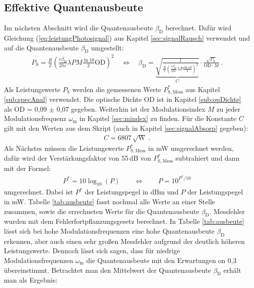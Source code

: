 \subsection{Effektive Quantenausbeute}
\label{sub:ausbeute}

Im nächsten Abschnitt wird die Quantenausbeute $\beta_\mathrm{D}$ berechnet. Dafür wird Gleichung (\ref{eq:leistungPhotosignal}) aus Kapitel \ref{sec:signalRausch} verwendet und auf die Quantenausbeute $\beta_\mathrm{D}$ umgestellt:
\begin{gather}
    P_\mathrm{S} = \frac{R}{2}\left(\frac{e\beta_\mathrm{D}}{2hc}\lambda P M \frac{\ln10}{2}\mathrm{OD}\right)^2
    \quad \Leftrightarrow \quad \beta_\mathrm{D} = \underbrace{\sqrt{\frac{1}{\frac{R}{2}\left(\frac{e\beta_\mathrm{D}}{2hc}\lambda P\frac{\ln10}{2}\right)^2}}}_{C} \cdot \frac{\sqrt{P_\mathrm{S}}}{\mathrm{OD}\cdot M}~.
\end{gather}
Als Leistungswerte $P_\mathrm{S}$ werden die gemessenen Werte $P^*_\mathrm{S,Mess}$ aus Kapitel \ref{sub:specAnal} verwendet. Die optische Dichte OD ist in Kapitel \ref{sub:opDichte} als OD = 0,09 $\pm$ 0,07 gegeben. Weiterhin ist der Modulationsindex $M$ zu jeder Modulationsfrequenz $\omega_\mathrm{m}$ in Kapitel \ref{sec:mindex} zu finden. Für die Konstante $C$ gilt mit den Werten aus dem Skript \cite{anleitung} (auch in Kapitel \ref{sec:signalAbsorp} gegeben):
\begin{gather}
    C= 6807\,\sqrt{\mathrm{W}}~.
\end{gather}
Als Nächstes müssen die Leistungswerte $P^*_\mathrm{S,Mess}$ in mW umgerechnet werden, dafür wird der Verstärkungsfaktor von 55\,dB von $P^*_\mathrm{S,Mess}$ subtrahiert und dann mit der Formel:
\begin{gather}
    P^* = 10\log_{10}(P) \qquad \Leftrightarrow \qquad P = 10^{P^*/10}
    \label{eq:dBmTomW}
\end{gather}
umgerechnet. \cite{anleitung} Dabei ist $P^*$ der Leistungspegel in dBm und $P$ der Leistungspegel in mW. 
Tabelle \ref{tab:ausbeute} fasst nochmal alle Werte an einer Stelle zusammen, sowie die errechneten Werte für die Quantenausbeute $\beta_\mathrm{D}$. Messfehler wurden mit dem Fehlerfortpflanzungsgesetz berechnet. In Tabelle \ref{tab:ausbeute} lässt sich bei hohe Modulationsfrequenzen eine hohe Quantenausbeute $\beta_\mathrm{D}$ erkennen, aber auch einen sehr großen Messfehler aufgrund der deutlich höheren Leistungswerte. Dennoch lässt sich sagen, dass für niedrige Modulationsfrequenzen $\omega_\mathrm{m}$ die Quantenausbeute mit den Erwartungen on 0,3 \cite{anleitung} übereinstimmt. Betrachtet man den Mittelwert der Quantenausbeute $\beta_\mathrm{D}$ erhält man als Ergebnis:
